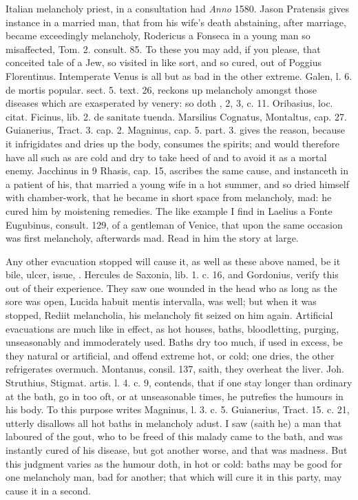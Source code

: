 {{Italian melancholy priest, in a consultation had \emph{Anno} 1580. Jason
Pratensis gives instance in a married man, that from his wife's death
abstaining, after marriage, became exceedingly melancholy,
Rodericus a Fonseca in a young man so misaffected, Tom. 2. consult. 85.
To these you may add, if you please, that conceited tale of a Jew, so
visited in like sort, and so cured, out of Poggius Florentinus.
Intemperate Venus is all but as bad in the other extreme. Galen, l. 6.
de mortis popular. sect. 5. text. 26, reckons up melancholy amongst
those diseases which are exasperated by venery: so doth \Avicenna{},
2, 3, c. 11. Oribasius, loc. citat. Ficinus, lib. 2. de sanitate
tuenda. Marsilius Cognatus, Montaltus, cap. 27. Guianerius, Tract. 3.
cap. 2. Magninus, cap. 5. part. 3. gives the reason, because
it infrigidates and dries up the body, consumes the spirits; and
would therefore have all such as are cold and dry to take heed of and
to avoid it as a mortal enemy. Jacchinus in 9 Rhasis, cap. 15, ascribes
the same cause, and instanceth in a patient of his, that married a
young wife in a hot summer, and so dried himself with
chamber-work, that he became in short space from melancholy, mad: he
cured him by moistening remedies. The like example I find in Laelius a
Fonte Eugubinus, consult. 129, of a gentleman of Venice, that upon the
same occasion was first melancholy, afterwards mad. Read in him the
story at large.

Any other evacuation stopped will cause it, as well as these above
named, be it bile, ulcer, issue, \etc{}. Hercules de Saxonia, lib. 1.
c. 16, and Gordonius, verify this out of their experience. They saw one
wounded in the head who as long as the sore was open, Lucida habuit
mentis intervalla, was well; but when it was stopped, Rediit
melancholia, his melancholy fit seized on him again.
Artificial evacuations are much like in effect, as hot houses, baths,
bloodletting, purging, unseasonably and immoderately used. Baths
dry too much, if used in excess, be they natural or artificial, and
offend extreme hot, or cold; one dries, the other refrigerates
overmuch. Montanus, consil. 137, saith, they overheat the liver. Joh.
Struthius, Stigmat. artis. l. 4. c. 9, contends, that if one stay
longer than ordinary at the bath, go in too oft, or at unseasonable
times, he putrefies the humours in his body. To this purpose writes
Magninus, l. 3. c. 5. Guianerius, Tract. 15. c. 21, utterly disallows
all hot baths in melancholy adust. I saw (saith he) a man that
laboured of the gout, who to be freed of this malady came to the bath,
and was instantly cured of his disease, but got another worse, and that
was madness. But this judgment varies as the humour doth, in hot or
cold: baths may be good for one melancholy man, bad for another; that
which will cure it in this party, may cause it in a second.

}}
